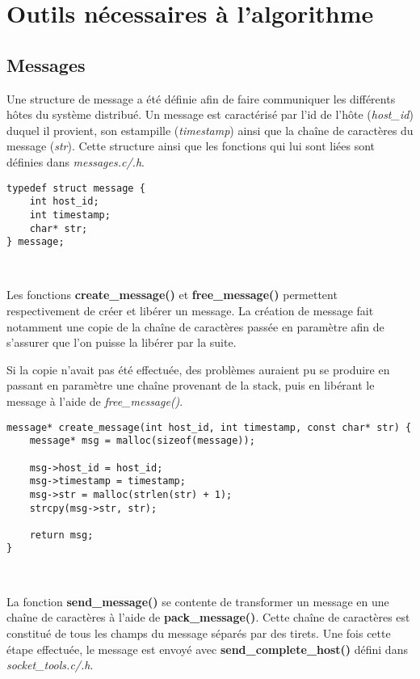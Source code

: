 \section{Outils nécessaires à l'algorithme}
\subsection{Messages}
Une structure de message a été définie afin de faire communiquer les différents hôtes du système distribué. Un message est caractérisé par l'id de l'hôte (\emph{host\_id}) duquel il provient, son estampille (\emph{timestamp}) ainsi que la chaîne de caractères du message (\emph{str}). Cette structure ainsi que les fonctions qui lui sont liées sont définies dans \emph{messages.c/.h}.\\

\begin{lstlisting}
typedef struct message {
	int host_id;
	int timestamp;
	char* str;
} message;
\end{lstlisting}
\

Les fonctions \textbf{create\_message()} et \textbf{free\_message()} permettent respectivement de créer et libérer un message. La création de message fait notamment une copie de la chaîne de caractères passée en paramètre afin de s'assurer que l'on puisse la libérer par la suite.

\begin{framewarning}
Si la copie n'avait pas été effectuée, des problèmes auraient pu se produire en passant en paramètre une chaîne provenant de la stack, puis en libérant le message à l'aide de \emph{free\_message()}.
\end{framewarning}

\begin{lstlisting}
message* create_message(int host_id, int timestamp, const char* str) {
	message* msg = malloc(sizeof(message));

	msg->host_id = host_id;
	msg->timestamp = timestamp;
	msg->str = malloc(strlen(str) + 1);
	strcpy(msg->str, str);

	return msg;
}
\end{lstlisting}
\

La fonction \textbf{send\_message()} se contente de transformer un message en une chaîne de caractères à l'aide de \textbf{pack\_message()}. Cette chaîne de caractères est constitué de tous les champs du message séparés par des tirets. Une fois cette étape effectuée, le message est envoyé avec \textbf{send\_complete\_host()} défini dans \emph{socket\_tools.c/.h}.\\

